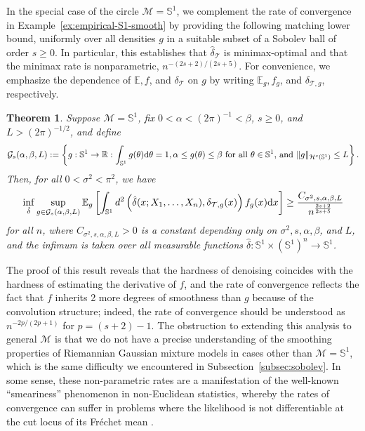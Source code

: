 \documentclass[preprint]{imsart}
\theoremstyle{plain}
\newtheorem{theorem}{Theorem}[section]
\theoremstyle{definition}
\newcommand{\Rbb}{\mathbb{R}}
\newcommand{\Ebb}{\mathbb{E}}
\newcommand{\Mcal}{\mathcal{M}}
\newcommand{\Hcal}{\mathcal{H}}
\newcommand{\diff}{\textnormal{d}}
\newcommand{\T}{\mathcal{T}}
\begin{document}
In the special case of the circle $\Mcal=\mathbb{S}^1$, we complement the rate of convergence in Example~\ref{ex:empirical-S1-smooth} by providing the following matching lower bound, uniformly over all densities $g$ in a suitable subset of a Sobolev ball of order $s\ge 0$.
In particular, this establishes that $\hat{\delta}_{\T}$ is minimax-optimal and that the minimax rate is nonparametric, $n^{-(2s+2)/(2s+5)}$.
For convenience, we emphasize the dependence of $\Ebb,f$, and $\delta_{\T}$ on $g$ by writing $\Ebb_g,f_g$, and $\delta_{\T,g}$, respectively.

\begin{theorem}\label{thm:S1-lower-bd}
    Suppose $\Mcal=\mathbb{S}^1$, fix $0<\alpha<(2\pi)^{-1}<\beta$, $s\ge0$, and $L>(2\pi)^{-1/2}$, and define
    \begin{equation*}
        \mathcal{G}_s(\alpha,\beta,L):=\left\{g:\mathbb{S}^1\to\Rbb: \int_{\mathbb{S}^1}g(\theta)\diff\theta =1,\alpha\le g(\theta)\le \beta \textnormal{ for all }\theta\in\mathbb{S}^1\textnormal{, and } \|g\|_{\Hcal^s(\mathbb{S}^1)}\le L\right\}.
    \end{equation*}
    Then, for all $0<\sigma^2<\pi^2$, we have
    \begin{equation*}
        \inf_{\hat{\delta}}\sup_{g\in \mathcal{G}_s(\alpha,\beta,L)}\Ebb_g\left[\int_{\mathbb{S}^1}d^2\left(\hat{\delta}(x;X_1,\ldots,X_n),\delta_{\T,g}(x)\right)f_g(x)\diff x\right] \ge\frac{C_{\sigma^2, s,\alpha,\beta,L}}{n^{\frac{2s+2}{2s+5}}}
    \end{equation*}
    for all $n$, where $C_{\sigma^2,s,\alpha,\beta,L}>0$ is a constant depending only on $\sigma^2,s,\alpha,\beta$, and $L$, and the infimum is taken over all measurable functions $\hat{\delta}:\mathbb{S}^1\times(\mathbb{S}^1)^n \to \mathbb{S}^1$.
\end{theorem}

The proof of this result reveals that the hardness of denoising coincides with the hardness of estimating the derivative of $f$, and the rate of convergence reflects the fact that $f$ inherits 2 more degrees of smoothness than $g$ because of the convolution structure; indeed, the rate of convergence should be understood as $n^{-2p/(2p+1)}$ for $p=(s+2)-1$.
The obstruction to extending this analysis to general $\Mcal$ is that we do not have a precise understanding of the smoothing properties of Riemannian Gaussian mixture models in cases other than $\Mcal=\mathbb{S}^1$, which is the same difficulty we encountered in  Subsection~\ref{subsec:sobolev}.
In some sense, these non-parametric rates are a manifestation of the well-known ``smeariness'' phenomenon in non-Euclidean statistics, whereby the rates of convergence can suffer in problems where the likelihood is not differentiable at the cut locus of its Fr\'echet mean \cite{HotzHuckemann,EltznerHuckemann,Eltzner,HundrieserEltznerHuckemann}.
\end{document}
